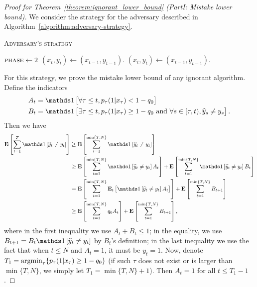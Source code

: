 \begin{proof}[Proof for Theorem~\ref{theorem:ignorant_lower_bound} (PartI: Mistake lower bound)]
We consider the strategy for the adversary described in Algorithm~\ref{algorithm:adversary-strategy}.
\begin{algorithm}[h]
\caption{\textsc{Adversary's strategy}}
\label{algorithm:adversary-strategy}
\begin{algorithmic}[1]
{
       \ELSE
          \STATE $\textsc{phase}\leftarrow 2$
       \ENDIF
       \STATE $(x_t, y_t)\leftarrow (x_{t-1}, y_{t-1})$.
    \ENDIF
\ENDFOR
{}
    \STATE $(x_t, y_t)\leftarrow (x_{t-1}, y_{t-1})$.
\ENDFOR


}
\end{algorithmic}
\end{algorithm}
For this strategy, we prove the mistake lower bound of any ignorant algorithm.
Define the indicators
\begin{align*}
A_t &= \indicator{\forall \tau\leq t, p_\tau(1|x_\tau)<1-q_0} \\
B_t &= \indicator{\exists \tau\leq t, p_\tau(1|x_\tau)\geq 1-q_0
 \text{\ and\ } \forall s\in[\tau,t), \widehat y_s \neq y_s}.
\end{align*}
Then we have
\begin{align}
    \mathbf{E}\left[\sum_{t=1}^{T} \indicator{\widehat y_t\neq y_t}\right]
    &\geq \mathbf{E}\left[\sum_{t=1}^{\min\{T,N\}} \indicator{\widehat y_t\neq y_t}\right] \nonumber \\
    & \geq \mathbf{E}\left[\sum_{t=1}^{\min\{T,N\}} \indicator{\widehat y_t\neq y_t}A_t\right] + \mathbf{E}\left[\sum_{t=1}^{\min\{T,N\}} \indicator{\widehat y_t\neq y_t}B_t\right] \nonumber \\
    & = \mathbf{E}\left[\sum_{t=1}^{\min\{T,N\}} \mathbf{E}_t\left[\indicator{\widehat y_t\neq y_t}A_t\right]\right] + \mathbf{E}\left[\sum_{t=1}^{\min\{T,N\}} B_{t+1}\right] \nonumber \\
    & \geq \mathbf{E}\left[\sum_{t=1}^{\min\{T,N\}} q_0 A_t\right] + \mathbf{E}\left[\sum_{t=1}^{\min\{T,N\}} B_{t+1}\right],
    \label{eqn:mistake_lower_bound_temp}
\end{align}
where in the first inequality we use $A_t+B_t\leq 1$;
in the equality, we use  $B_{t+1}=B_t\indicator{\widehat y_t\neq y_t}$ by $B_t$'s definition;
in the last inequality we use the fact that when $t\leq N$ and $A_t=1$, it must be $y_t=1$.
Now, denote $T_1 = \operatorname*{argmin}_{\tau} \{ p_\tau(1|x_\tau) \geq 1-q_0 \}$ (if such $\tau$ does not exist or is larger than $\min\{T,N\}$, we simply let $T_1=\min\{T,N\}+1$).
Then $A_t=1$ for all $t\leq T_1-1$.


\end{proof}
